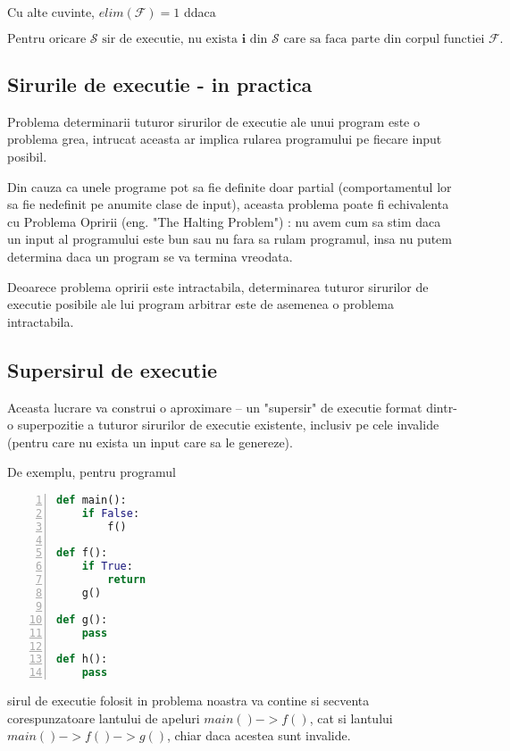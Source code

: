 Cu alte cuvinte, $elim(\mathcal{F}) = 1$ ddaca

\[
	\text{Pentru oricare } \mathcal{S} \text{ sir de executie, nu
		exista } \mathbf{i} \text{ din } \mathcal{S} \text { care sa faca
		parte din corpul functiei } \mathcal{F}.
\]

\subsection{Sirurile de executie - in practica}

Problema determinarii tuturor sirurilor de executie ale unui
program este o problema grea, intrucat aceasta ar implica rularea
programului pe fiecare input posibil.

Din cauza ca unele programe pot sa fie definite doar partial
(comportamentul lor sa fie nedefinit pe anumite clase de input),
aceasta problema poate fi echivalenta cu Problema Opririi (eng. "The
Halting Problem") \cite{the_halting_problem}: nu avem cum sa stim
daca un input al programului este bun sau nu fara sa rulam
programul, insa nu putem determina daca un program se va termina
vreodata.

Deoarece problema opririi este intractabila, determinarea tuturor
sirurilor de executie posibile ale lui program arbitrar este de
asemenea o problema intractabila.

\subsection{Supersirul de executie}\label{supersirul_de_executie}

Aceasta lucrare va construi o aproximare -- un "supersir" de executie format
dintr-o superpozitie a tuturor sirurilor de executie existente, inclusiv pe cele
invalide (pentru care nu exista un input care sa le genereze).

De exemplu, pentru programul
\begin{lstlisting}[language=Python, numbers=left]
def main():
    if False:
        f()

def f():
    if True:
        return
    g()

def g():
    pass

def h():
    pass
\end{lstlisting}

sirul de executie folosit in problema noastra va contine si
secventa corespunzatoare lantului de apeluri \(main() -> f()\),
cat si lantului \(main() -> f() -> g()\),
chiar daca acestea sunt invalide.

